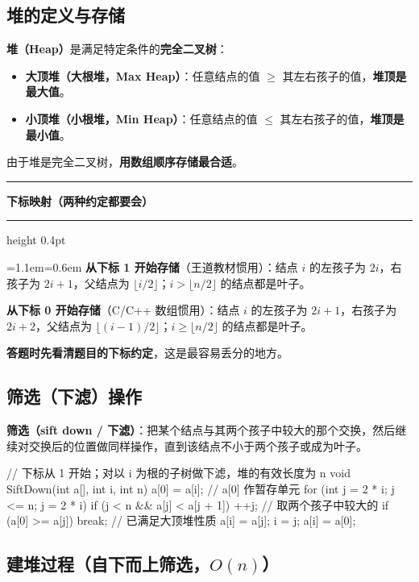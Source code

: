 \documentclass[11pt,openany,UTF8]{ctexbook}
\newcommand{\callouthead}[2]{%
  \par\addvspace{7pt}\noindent
  {\color{#1}\rule[-0.15em]{3pt}{1.05em}}\hspace{0.5em}%
  {\bfseries\color{#1}#2}\par\nobreak\vspace{-0.35em}%
  {\color{rulesep}\hrule height 0.4pt}\nobreak\vspace{0.45em}%
  \begingroup\small\setlength{\parindent}{0pt}%
  \leftskip=1.1em\rightskip=0.6em\noindent\ignorespaces}
\newcommand{\calloutend}{\par\endgroup\addvspace{7pt}}
\newenvironment{callkey}[1]{\callouthead{keybar}{#1}}{\calloutend}
\begin{document}
\subsection{堆的定义与存储}

\textbf{堆（Heap）}是满足特定条件的\textbf{完全二叉树}：

\begin{itemize}
\item \textbf{大顶堆（大根堆，Max Heap）}：任意结点的值 $\ge$ 其左右孩子的值，\textbf{堆顶是最大值}。
\item \textbf{小顶堆（小根堆，Min Heap）}：任意结点的值 $\le$ 其左右孩子的值，\textbf{堆顶是最小值}。
\end{itemize}
由于堆是完全二叉树，\textbf{用数组顺序存储最合适}。

\begin{callkey}{下标映射（两种约定都要会）}
\textbf{从下标 1 开始存储}（王道教材惯用）：结点 $i$ 的左孩子为 $2i$，右孩子为 $2i+1$，父结点为 $\lfloor i/2\rfloor$；$i>\lfloor n/2\rfloor$ 的结点都是叶子。

\textbf{从下标 0 开始存储}（C/C++ 数组惯用）：结点 $i$ 的左孩子为 $2i+1$，右孩子为 $2i+2$，父结点为 $\lfloor (i-1)/2\rfloor$；$i\ge\lfloor n/2\rfloor$ 的结点都是叶子。

\textbf{答题时先看清题目的下标约定}，这是最容易丢分的地方。

\end{callkey}

\subsection{筛选（下滤）操作}

\textbf{筛选（sift down / 下滤）}：把某个结点与其两个孩子中较大的那个交换，然后继续对交换后的位置做同样操作，直到该结点不小于两个孩子或成为叶子。

\begin{codebox}
// 下标从 1 开始；对以 i 为根的子树做下滤，堆的有效长度为 n
void SiftDown(int a[], int i, int n) {
    a[0] = a[i];                     // a[0] 作暂存单元
    for (int j = 2 * i; j <= n; j = 2 * i) {
        if (j < n && a[j] < a[j + 1]) ++j;   // 取两个孩子中较大的
        if (a[0] >= a[j]) break;             // 已满足大顶堆性质
        a[i] = a[j];
        i = j;
    }
    a[i] = a[0];
}
\end{codebox}

\subsection{建堆过程（自下而上筛选，$O(n)$）}
\end{document}
